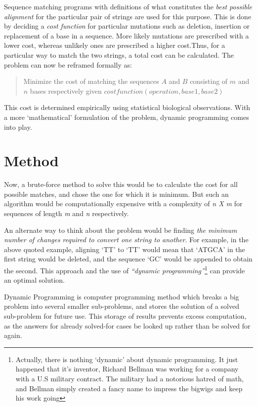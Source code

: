 \documentclass[11pt,a4paper]{article}
\begin{document}
	Sequence matching programs with definitions of what constitutes the \emph{best possible alignment} for the particular pair of strings are used for this purpose. This is done by deciding a \emph{cost function} for particular mutations such as deletion, insertion or replacement of a base in a sequence. More likely mutations are prescribed with a lower cost, whereas unlikely ones are prescribed a higher cost.Thus, for a particular way to match the two strings, a total cost can be calculated. The problem can now be reframed formally as:\begin{quote} Minimize the cost of matching the sequences $A$ and $B$ consisting of $m$ and $n$ bases respectively given $costfunction(operation, base1, base2)$ \end{quote} This cost is determined empirically using statistical biological observations. With a more `mathematical' formulation of the problem, dynamic programming comes into play.

		\section{Method}

Now, a brute-force method to solve this would be to calculate the cost for all possible matches, and chose the one for which it is minimum. But such an algorithm would be computationally expensive with a complexity of \emph{n X m} for sequences of length \emph{m} and \emph{n} respectively.

An alternate way to think about the problem would be finding \emph{the minimum number of changes required to convert one string to another}. For example, in the above quoted example, aligning `TT' to `TT' would mean that `ATGCA' in the first string would be deleted, and the sequence `GC' would be appended to obtain the second. This approach and the use of \emph{``dynamic programming''}\footnote{Actually, there is nothing `dynamic' about dynamic programming. It just happened that it's inventor, Richard Bellman was working for a company with a U.S military contract. The military had a notorious hatred of math, and Bellman simply created a fancy name to impress the bigwigs and keep his work going} can provide an optimal solution.

Dynamic Programming is computer programming method which breaks a big problem into several smaller sub-problems, and stores the solution of a solved sub-problem for future use. This storage of results prevents excess computation, as the answers for already solved-for cases be looked up rather than be solved for again.
\end{document}
